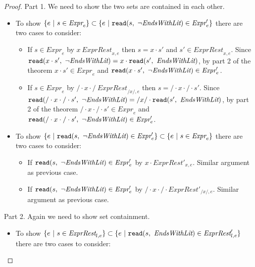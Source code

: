 \documentclass[preprint,10pt]{sigplanconf}
\begin{document}
\begin{proof}\mbox{}
  Part 1. We need to show the two sets are contained in each other.
  \begin{itemize}
  \item To show 
  \( 
  \{ e ~|~ s \in \textit{Expr}_{e} \} 
  \subset  
  \{ e ~|~ \texttt{read}(s,~\neg \textit{EndsWithLit}) \in \textit{Expr}'_{e}
  \}
  \) there are two cases to consider:
    \begin{itemize}
    \item If \( s \in \textit{Expr}_{e} \) by \( x~\textit{ExprRest}_{x,
        e} \) then \( s = x\cdot s' \) and \( s' \in
      \textit{ExprRest}_{x, e} \). 
      Since
      \(
      \texttt{read}(x \cdot s',~\neg \textit{EndsWithLit}) 
      =
      x \cdot \texttt{read}(s',~\textit{EndsWithLit})
      \),
      by part 2 of the theorem \( x\cdot s' \in \textit{Expr}_{e} \) and 
      \( \texttt{read}(x \cdot s',~\neg \textit{EndsWithLit}) \in \textit{Expr}'_{e} \).
    \item If \( s \in \textit{Expr}_{e} \) by 
      \( / \cdot x \cdot /~\textit{ExprRest}_{/x/, e} \) 
      then \( s = /\cdot x \cdot /\cdot s' \).
      Since
      \(
      \texttt{read}(/ \cdot x \cdot / \cdot s',~\neg \textit{EndsWithLit}) 
      =
      /x/ \cdot \texttt{read}(s',~\textit{EndsWithLit})
      \),
      by part 2 of the theorem 
      \( /\cdot x \cdot / \cdot s' \in \textit{Expr}_{e} \) and 
      \( \texttt{read}(/ \cdot x \cdot / \cdot s',~\neg \textit{EndsWithLit}) 
      \in \textit{Expr}'_{e} \).
    \end{itemize}
    
  \item To show 
  \( 
  \{ e ~|~ \texttt{read}(s,~\neg \textit{EndsWithLit}) \in \textit{Expr}'_{e}
  \}
  \subset  
  \{ e ~|~ s \in \textit{Expr}_{e} \} 
  \) there are two cases to consider:
  \begin{itemize}

  \item If 
    \( \texttt{read}(s,~\neg \textit{EndsWithLit}) \in \textit{Expr}'_{e} \)
    by \( x \cdot \textit{ExprRest}'_{x, e} \). Similar argument as
    previous case.
    
  \item If 
    \( \texttt{read}(s,~\neg \textit{EndsWithLit}) \in \textit{Expr}'_{e} \)
    by \( /\cdot x\cdot / \cdot \textit{ExprRest}'_{/x/, e} \). Similar argument as
    previous case.
  \end{itemize}
  
  \end{itemize}
  
  Part 2. Again we need to show set containment.
  \begin{itemize}
  \item To show
  \( 
  \{ e ~|~ s \in \textit{ExprRest}_{l, e} \} 
  \subset  
  \{ e ~|~ \texttt{read}(s,~\textit{EndsWithLit}) \in \textit{ExprRest}'_{l,e}
  \}
  \) there are two cases to consider:
  \begin{itemize}


\end{itemize}
\end{itemize}
\end{proof}
\end{document}
